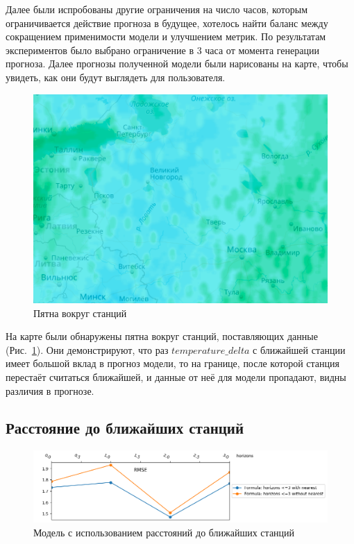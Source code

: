 \documentclass[14pt]{matmex-diploma}
\begin{document}
Далее были испробованы другие ограничения на число часов, которым ограничивается действие прогноза в будущее, хотелось найти баланс между сокращением применимости модели и улучшением метрик. По результатам экспериментов было выбрано ограничение в 3 часа от момента генерации прогноза. Далее прогнозы полученной модели были нарисованы на карте, чтобы увидеть, как они будут выглядеть для пользователя.

\begin{figure}
\centering
\includegraphics[width=0.7\linewidth]{images/pic2_map.png}
\caption{Пятна вокруг станций}
\label{pic2_map}
\end{figure}

На карте были обнаружены пятна вокруг станций, поставляющих данные (Рис.~\ref{pic2_map}). Они демонстрируют, что раз $temperature\_delta$ с ближайшей станции имеет большой вклад в прогноз модели, то на границе, после которой станция перестаёт считаться ближайшей, и данные от неё для модели пропадают, видны различия в прогнозе.



\subsection{Расстояние до ближайших станций}

\begin{figure}
\centering
\includegraphics[width=\linewidth]{images/pic3_metrics_final.png}
\caption{Модель с использованием расстояний до ближайших станций}
\label{pic3_metrics_final}
\end{figure}
\end{document}
